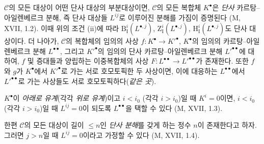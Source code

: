 \begin{env}[11.4.2]
$\mathcal C$의 모든 대상이 어떤 단사 대상의 부분대상이면,
$\mathcal C$의 모든 복합체 $K^\bullet$은 \emph{단사} 카르탕--아일렌베르크
분해, 즉 단사 대상들 $L^{ij}$로 이루어진 분해를 가짐이 증명된다
(M, XVII, 1.2). 이때 위의 조건 (ii)에 따라
$\mathrm B_{\mathrm I}^i(L^{\bullet,j})$,
$\mathrm Z_{\mathrm I}^i(L^{\bullet,j})$,
$\mathrm H_{\mathrm I}^i(L^{\bullet,j})$도 단사 대상이다. 더 나아가,
$\mathcal C$의 복합체의 임의의 사상 $f:K^\bullet\to K'^\bullet$,
$K^\bullet$의 임의의 카르탕--아일렌베르크 분해
$L^{\bullet\bullet}$, 그리고 $K'^\bullet$의 임의의 단사
카르탕--아일렌베르크 분해 $L'^{\bullet\bullet}$에 대하여, $f$ 및
증대들과 양립하는 이중복합체의 사상
$F:L^{\bullet\bullet}\to L'^{\bullet\bullet}$가 존재한다. 또한 $f$와
$g$가 $K^\bullet$에서 $K'^\bullet$로 가는 서로 호모토픽한 두 사상이면,
이에 대응하는 $L^{\bullet\bullet}$에서 $L'^{\bullet\bullet}$로 가는
사상들도 서로 호모토픽하다(\emph{같은 곳}).

$K^\bullet$이 \emph{아래로 유계}(각각 \emph{위로 유계})이고 $i<i_0$
(각각 $i>i_0$)일 때 $K^i=0$이면, $i<i_0$ (각각 $i>i_0$)일 때
$L^{ij}=0$이 되도록 $L^{\bullet\bullet}$을 택할 수 있다
(M, XVII, 1.3).

한편 $\mathcal C$의 모든 대상이 길이 $\leq n$인 \emph{단사 분해}를
갖게 하는 정수 $n$이 존재한다고 하자. 그러면 $j>n$일 때
$L^{ij}=0$이라고 가정할 수 있다 (M, XVII, 1.4).
\end{env}


